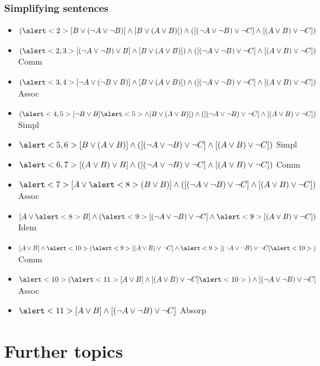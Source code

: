 \begin{frame}
\frametitle{Simplifying sentences}
\small
\setlength{\leftmargini}{0cm}
\begin{itemize}[<+->]
\item[] $(\alert<2>{[B \lor (\lnot A \lor \lnot B)]} \land [B \lor (A \lor
B)]) \land {}
([(\lnot A \lor \lnot B) \lor \lnot C] \land [(A \lor
B) \lor \lnot C])$
\item[] $(\alert<2,3>{[(\lnot A \lor \lnot B) \lor B]} \land [B \lor (A \lor
B)]) \land ([(\lnot A \lor \lnot B) \lor \lnot C] \land [(A \lor
B) \lor \lnot C])$\hfill\alert<2>{Comm}
\item[] $(\alert<3,4>{[\lnot A \lor (\lnot B \lor B)]} \land [B \lor (A \lor
B)]) \land ([(\lnot A \lor \lnot B) \lor \lnot C] \land [(A \lor
B) \lor \lnot C])$\hfill\alert<3>{Assoc}
\item[] $(\alert<4,5>{[\lnot B \lor B]} \alert<5>{\land [B \lor (A \lor
B)]}) \land ([(\lnot A \lor \lnot B) \lor \lnot C] \land [(A \lor
B) \lor \lnot C])$ \hfill\alert<4>{Simpl}
\item[] $\alert<5,6>{[B \lor (A \lor
B)]} \land
([(\lnot A \lor \lnot B) \lor \lnot C] \land [(A \lor
B) \lor \lnot C])$ \hfill\alert<5>{Simpl}
\item[] $\alert<6,7>{[(A \lor
B) \lor B]} \land
([(\lnot A \lor \lnot B) \lor \lnot C] \land [(A \lor
B) \lor \lnot C])$ \hfill\alert<6>{Comm}
\item[] $\alert<7>{[A \lor
\alert<8>{(B \lor B)}]} \land ([(\lnot A \lor \lnot B) \lor \lnot C] \land [(A \lor
B) \lor \lnot C])$\hfill\alert<7>{Assoc}
\item[] $[A \lor
\alert<8>{B}] \land
(\alert<9>{[(\lnot A \lor \lnot B) \lor \lnot C]} \land \alert<9>{[(A \lor
B) \lor \lnot C]})$ \hfill\alert<8>{Idem}
\item[] $[A \lor B] \land \alert<10>{(}\alert<9>{[(A \lor
B) \lor \lnot C]} \land
\alert<9>{[(\lnot A \lor \lnot B) \lor \lnot C]\alert<10>{)}}$ \hfill\alert<9>{Comm}
\item[] $\alert<10>{(}\alert<11>{[A \lor B] \land [(A \lor
B) \lor \lnot C]}\alert<10>{)} \land
[(\lnot A \lor \lnot B) \lor \lnot C]$ \hfill\alert<10>{Assoc}
\item[] $\alert<11>{[A \lor B]} \land
[(\lnot A \lor \lnot B) \lor \lnot C]$ \hfill\alert<11>{Absorp}
\end{itemize}
\end{frame}


\newhourlecture
\newonlinelecture

\section{Further topics}

